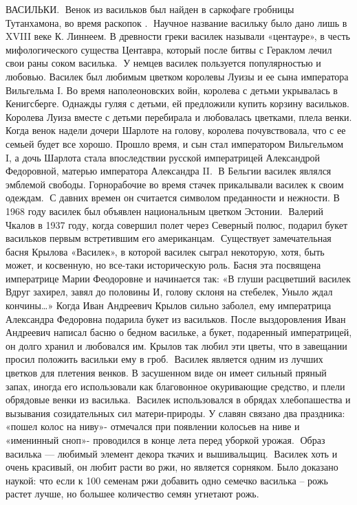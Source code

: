 ВАСИЛЬКИ.
🔹Венок  из васильков был найден в саркофаге гробницы Тутанхамона, во время раскопок . 
🔹Научное название васильку было дано лишь в XVIII веке К. Линнеем. 
В древности греки василек называли «центауре», в честь мифологического существа Центавра, который после битвы с Гераклом лечил свои раны соком василька.
🔹У немцев василек пользуется популярностью и любовью. Василек был любимым цветком королевы Луизы и ее сына императора Вильгельма I. 
Во время наполеоновских войн, королева с детьми укрывалась в Кенигсберге. 
Однажды гуляя с детьми, ей предложили купить корзину васильков. 
Королева Луиза вместе с детьми перебирала и любовалась цветками, плела венки. 
Когда венок надели дочери Шарлоте на голову, королева почувствовала, что с ее семьей будет все хорошо. 
Прошло время, и сын стал императором Вильгельмом I, а дочь Шарлота стала впоследствии русской императрицей Александрой Федоровной, матерью императора Александра II. 
🔹В Бельгии василек являлся эмблемой свободы. 
Горнорабочие во время стачек прикалывали василек к своим одеждам.
🔹С давних времен он считается символом преданности и нежности. 
В 1968 году василек был объявлен национальным цветком Эстонии.
🔹Валерий Чкалов в 1937 году, когда совершил полет через Северный полюс, подарил букет васильков первым встретившим его американцам.
🔹Существует замечательная басня Крылова «Василек», в которой василек сыграл некоторую, хотя, быть может, и косвенную, но все-таки историческую роль. 
Басня эта посвящена императрице Марии Феодоровне и начинается так:
«В глуши расцветший василек
Вдруг захирел, завял до половины
И, голову склоня на стебелек,
Уныло ждал кончины…»
Когда Иван Андреевич Крылов сильно заболел, ему императрица Александра Федоровна подарила букет из васильков. 
После выздоровления Иван Андреевич написал басню о бедном васильке, а букет, подаренный императрицей, он долго хранил и любовался им. Крылов так любил эти цветы, что в завещании просил положить васильки ему в гроб.
🔹Василек является одним из лучших цветков для плетения венков. 
В засушенном виде он имеет сильный пряный запах, иногда его использовали как благовонное окуривающие средство, и плели обрядовые венки из василька.
🔹Василек использовался в обрядах хлебопашества и вызывания созидательных сил матери-природы. 
У славян связано два праздника: «пошел колос на ниву»- отмечался при появлении колосьев на ниве и «именинный сноп»- проводился в конце лета перед уборкой урожая.
🔹Образ василька — любимый элемент декора ткачих и вышивальщиц.
🔹Василек хоть и очень красивый, он любит расти во ржи, но является сорняком. 
Было доказано наукой: что если к 100 семенам ржи добавить одно семечко василька – рожь растет лучше, но большее количество семян угнетают рожь.
